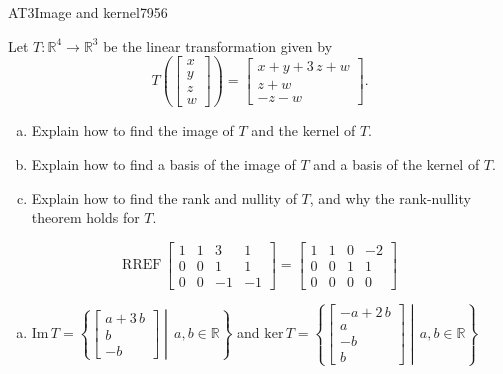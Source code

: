 \begin{exercise}{AT3}{Image and kernel}{7956} 
\begin{exerciseStatement} 

 Let \(T:\mathbb{R}^4 \to \mathbb{R}^3\) be the linear transformation given by \[T\left( \left[\begin{array}{c}
x \\
y \\
z \\
{w}
\end{array}\right] \right) = \left[\begin{array}{c}
x + y + 3 \, z + {w} \\
z + {w} \\
-z - {w}
\end{array}\right].\] 

 

\begin{enumerate}[(a)]
\item Explain how to find the image of \(T\) and the kernel of \(T\).
\item Explain how to find a basis of the image of \(T\) and a basis of the kernel of \(T\).
\item Explain how to find the rank and nullity of \(T\), and why the rank-nullity theorem holds for \(T\).
\end{enumerate}

     \end{exerciseStatement}
 \begin{exerciseAnswer} 

\[\mathrm{RREF}\,\left[\begin{array}{cccc}
1 & 1 & 3 & 1 \\
0 & 0 & 1 & 1 \\
0 & 0 & -1 & -1
\end{array}\right]=\left[\begin{array}{cccc}
1 & 1 & 0 & -2 \\
0 & 0 & 1 & 1 \\
0 & 0 & 0 & 0
\end{array}\right]\]

 

\begin{enumerate}[(a)]
\item  

 \(\mathrm{Im}\,T =  \left\{ \left[\begin{array}{c}
a + 3 \, b \\
b \\
-b
\end{array}\right] \middle|\,a,b\in\mathbb{R}\right\}\) and \(\mathrm{ker}\,T = \left\{ \left[\begin{array}{c}
-a + 2 \, b \\
a \\
-b \\
b
\end{array}\right] \middle|\,a,b\in\mathbb{R}\right\}\) 


\end{enumerate}
\end{exerciseAnswer}
\end{exercise}
